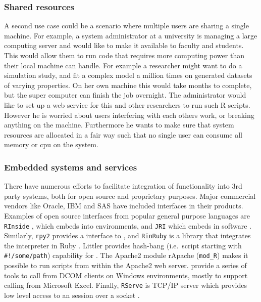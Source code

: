 \subsubsection{Shared resources}

A second use case could be a scenario where multiple users are sharing a single
machine. For example, a system administrator at a university is managing a large
computing server and would like to make it available to faculty and students.
This would allow them to run \R code that requires more computing power than
their local machine can handle. For example a researcher might want to do a
simulation study, and fit a complex model a million times on generated datasets
of varying properties. On her own machine this would take months to complete,
but the super computer can finish the job overnight. The administrator would
like to set up a web service for this and other researchers to run such R
scripts. However he is worried about users interfering with each others work, or
breaking anything on the machine. Furthermore he wants to make sure that system
resources are allocated in a fair way such that no single user can consume all
memory or cpu on the system.

\subsubsection{Embedded systems and services}

There have numerous efforts to facilitate integration of \R functionality into
3rd party systems, both for open source and proprietary purposes. Major
commercial vendors like Oracle, IBM and SAS have included \R interfaces in their
products. Examples of open source interfaces from popular general purpose
languages are \texttt{RInside} \citep{RInside}, which embeds \R into \Cpp
environments, and \texttt{JRI} which embeds \R in \Java software
\citep{JRI,urbanek2007rjava}. Similarly, \texttt{rpy2}
\citep{moreira2006rpy,gautier2008rpy2} provides a \Python interface to \R, and
\texttt{RinRuby} is a \Ruby library that integrates the \R interpreter in Ruby
\citep{dahl2008rinruby}. Littler provides hash-bang (i.e.\ script starting with
\texttt{\#!/some/path}) capability for \R \citep{littler}. The Apache2 module
rApache (\texttt{mod\_R}) \citep{rapache} makes it possible to run \R scripts
from within the Apache2 web server. \cite{heiberger2009r} provide a series of
tools to call \R from DCOM clients on Windows environments, mostly to support
calling \R from Microsoft Excel. Finally, \texttt{RServe} is TCP/IP server which
provides low level access to an \R session over a socket \citep{Rserve}.

